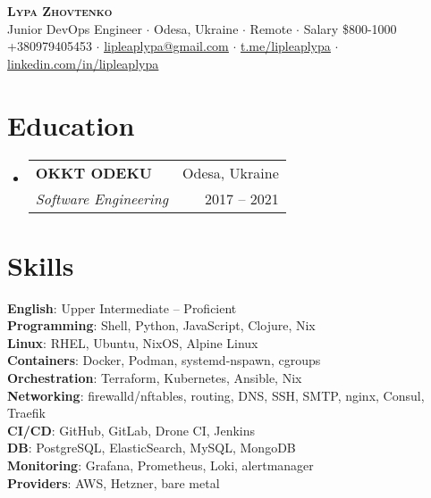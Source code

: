 \documentclass[letterpaper,11pt]{article}
\makeatletter
\newcommand{\resumeSubheading}[4]{
  \vspace{-2pt}\item
    \begin{tabular*}{0.97\textwidth}[t]{l@{\extracolsep{\fill}}r}
      \textbf{#1} & #2 \\
      \textit{\small#3} & {\small #4} \\
    \end{tabular*}\vspace{-7pt}
}
\newcommand{\resumeSubHeadingListStart}{\begin{itemize}[leftmargin=0.15in, label={}]}
\newcommand{\resumeSubHeadingListEnd}{\end{itemize}}
\makeatother
\begin{document}
\begin{center}
    \textbf{\Huge \scshape Lypa Zhovtenko} \\ \vspace{7pt}
    \small Junior DevOps Engineer \( \cdot \) Odesa, Ukraine \( \cdot \) Remote \( \cdot \) Salary \$800-1000 \\
    \small +380979405453 \( \cdot \) \href{mailto:lipleaplypa@gmail.com}{\underline{lipleaplypa@gmail.com}} \( \cdot \)
    \href{https://t.me/lipleaplypa}{\underline{t.me/lipleaplypa}} \( \cdot \)
    \href{https://linkedin.com/in/lipleaplypa}{\underline{linkedin.com/in/lipleaplypa}}
\end{center}

\section{Education}
  \resumeSubHeadingListStart
    \resumeSubheading
      {OKKT ODEKU}{Odesa, Ukraine}
      {Software Engineering}{2017 -- 2021}
  \resumeSubHeadingListEnd

\section{Skills}
 \begin{itemize}[leftmargin=0.15in, label={}]
    \small{\item{
     \textbf{English}{: Upper Intermediate -- Proficient} \\
     \textbf{Programming}{: Shell, Python, JavaScript, Clojure, Nix} \\
     \textbf{Linux}{: RHEL, Ubuntu, NixOS, Alpine Linux} \\
     \textbf{Containers}{: Docker, Podman, systemd-nspawn, cgroups} \\
     \textbf{Orchestration}{: Terraform, Kubernetes, Ansible, Nix} \\
     \textbf{Networking}{: firewalld/nftables, routing, DNS, SSH, SMTP, nginx, Consul, Traefik } \\
     \textbf{CI/CD}{: GitHub, GitLab, Drone CI, Jenkins} \\
     \textbf{DB}{: PostgreSQL, ElasticSearch, MySQL, MongoDB} \\
     \textbf{Monitoring}{: Grafana, Prometheus, Loki, alertmanager} \\
     \textbf{Providers}{: AWS, Hetzner, bare metal}
    }}
 \end{itemize}
\end{document}
